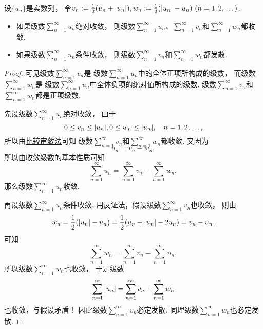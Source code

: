 \begin{theorem}\label{theorem:无穷级数.绝对收敛级数必定收敛}
设\(\{u_n\}\)是实数列，
令\(v_n := \frac12 (u_n + \abs{u_n}),
w_n := \frac12 (\abs{u_n} - u_n)
\ (n=1,2,\dotsc)\).
\begin{itemize}
	\item 如果级数\(\sum_{n=1}^\infty u_n\)绝对收敛，
	则级数\(\sum_{n=1}^\infty u_n\)、\(\sum_{n=1}^\infty v_n\)和\(\sum_{n=1}^\infty w_n\)都收敛.

	\item 如果级数\(\sum_{n=1}^\infty u_n\)条件收敛，
	则级数\(\sum_{n=1}^\infty v_n\)和\(\sum_{n=1}^\infty w_n\)都发散.
\end{itemize}
\begin{proof}
可见级数\(\sum_{n=1}^\infty v_n\)是
级数\(\sum_{n=1}^\infty u_n\)中的全体正项所构成的级数，
而级数\(\sum_{n=1}^\infty w_n\)是
级数\(\sum_{n=1}^\infty u_n\)中全体负项的绝对值所构成的级数.
级数\(\sum_{n=1}^\infty v_n\)和\(\sum_{n=1}^\infty w_n\)都是正项级数.

先设级数\(\sum_{n=1}^\infty u_n\)绝对收敛，
由于\begin{equation*}
	0 \leq v_n \leq \abs{u_n},
	0 \leq w_n \leq \abs{u_n},
	\quad n=1,2,\dotsc,
\end{equation*}
所以由\hyperref[theorem:无穷级数.正项级数的比较审敛法]{比较审敛法}可知
级数\(\sum_{n=1}^\infty v_n\)和\(\sum_{n=1}^\infty w_n\)都收敛.
又因为\begin{equation*}
	u_n = v_n - w_n,
\end{equation*}
所以由\hyperref[theorem:无穷级数.收敛级数性质2]{收敛级数的基本性质}可知\begin{equation*}
	\sum_{n=1}^\infty u_n
	= \sum_{n=1}^\infty v_n
	- \sum_{n=1}^\infty w_n,
\end{equation*}
那么级数\(\sum_{n=1}^\infty u_n\)收敛.

再设级数\(\sum_{n=1}^\infty u_n\)条件收敛.
用反证法，假设级数\(\sum_{n=1}^\infty v_n\)也收敛，
则由\begin{equation*}
	w_n = \frac12 (\abs{u_n} - u_n)
	= \frac12 (u_n + \abs{u_n} - 2 u_n)
	= v_n - u_n,
\end{equation*}可知\begin{equation*}
	\sum_{n=1}^\infty w_n
	= \sum_{n=1}^\infty v_n
	- \sum_{n=1}^\infty u_n,
\end{equation*}
所以级数\(\sum_{n=1}^\infty w_n\)也收敛，
于是级数\begin{equation*}
	\sum_{n=1}^\infty \abs{u_n}
	= \sum_{n=1}^\infty v_n
	+ \sum_{n=1}^\infty w_n
\end{equation*}也收敛，与假设矛盾！
因此级数\(\sum_{n=1}^\infty v_n\)必定发散.
同理级数\(\sum_{n=1}^\infty w_n\)也必定发散.
\end{proof}
\end{theorem}

